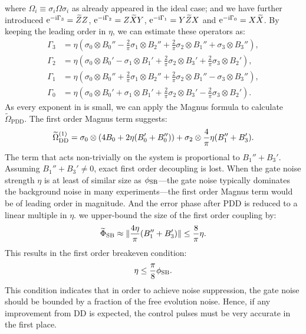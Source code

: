 \documentclass[b5paper,11pt]{article}
\newcommand{\wt}[1]{\widetilde{#1}}
\newcommand{\rDD}{\mathrm{DD}}
\begin{document}
where $\Omega_i \equiv \sigma_i \Omega \sigma_i$ as already appeared in 
 the ideal case; and we have further introduced
$\upe^{-\upi  \Gamma_3}=\wt Z Z$, 
$\upe^{-\upi  \Gamma_2}=Z \wt X Y$,
$\upe^{-\upi  \Gamma_1}=Y \wt Z X$ and 
$\upe^{-\upi  \Gamma_0}=X \wt X$.
By keeping the leading order in 
$\eta$, we can estimate these operators as:
\begin{equation}
 \begin{aligned}
  \Gamma_3 &= \eta(\sigma_0 \otimes B_0''- \frac{2}{\pi} \sigma_1 \otimes B_2'' 
  +\frac{2}{\pi}  \sigma_2 \otimes B_1'' + \sigma_3 \otimes B_3''),\\
  \Gamma_2 &= \eta(\sigma_0 \otimes B_0'- \sigma_1 \otimes B_1'
  +\frac{2}{\pi}  \sigma_2 \otimes B_3' + \frac{2}{\pi} \sigma_3 \otimes B_2'),\\
  \Gamma_1 &= \eta(\sigma_0 \otimes B_0''+ \frac{2}{\pi} \sigma_1 \otimes B_2'' 
  +\frac{2}{\pi}  \sigma_2 \otimes B_1'' - \sigma_3 \otimes B_3''),\\
  \Gamma_0 &= \eta(\sigma_0 \otimes B_0'+ \sigma_1 \otimes B_1'
  +\frac{2}{\pi}  \sigma_2 \otimes B_3' - \frac{2}{\pi} \sigma_3 \otimes B_2').
 \end{aligned}
\end{equation}
As every exponent in   is small, we can apply the Magnus formula to calculate $\widetilde\Omega_\mathrm{PDD}$. 
The first order Magnus term suggests:
\begin{equation}
 \wt\Omega_\rDD\up{1}= \sigma_0 \otimes (4B_0 + 2\eta( B'_0 + B''_0)) 
+ \sigma_2 \otimes \frac{4}{\pi}\eta(B_1''+B_3').
\end{equation}
The term that acts non-trivially on the system is proportional to $B_1''+B_3'$. 
Assuming $B_1''+B_3'\neq 0$,  exact first order decoupling is lost. 
When the gate noise strength $\eta$ is at least of similar size as $\phi_{\mathrm{SB}}$---the gate noise typically dominates the background noise in many experiments---the first order Magnus term would be of leading order in magnitude. And the error phase after PDD is reduced to a linear multiple in $\eta$. 
 we upper-bound the size of the first order coupling by:
\begin{equation}
 \wt\Phi_\rSB \approx \norm{ \frac{4\eta}{\pi}(B_1''+B_3')} \le \frac{8}{\pi}\eta.
\end{equation}
This results in the first order breakeven condition:
\begin{equation}
 \eta \le \frac{\pi}{8} \phi_{\mathrm{SB}}.
\end{equation}
This condition indicates that in order to achieve noise suppression, the gate noise should be bounded by a fraction of the free evolution noise. Hence, if any improvement from DD is expected, the control pulses must be very accurate in the first place. 
\end{document}
